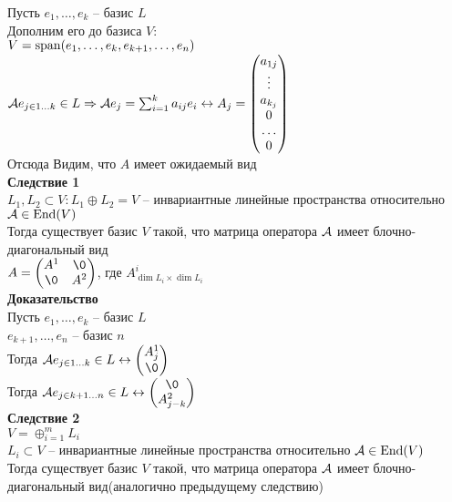 \documentclass[12pt]{article}
\begin{document}
Пусть $e_1, \ldots, e_k$ -- базис $L$\\
Дополним его до базиса $V$:\\
$V = \operatorname{span} (e_1, \ldots, e_k, e_{k+1}, \ldots, e_n)$\\
$\mathcal{A} e_{j\in 1\ldots k} \in L \Rightarrow \mathcal{A} e_j = \sum_{i=1}^k a_{ij}e_i \leftrightarrow A_j = \begin{pmatrix}
    a_{1j}\\
    \vdots\\
    a_{k_j}\\
    0\\
    \ldots\\
    0
\end{pmatrix}$\\
Отсюда Видим, что $A$ имеет ожидаемый вид\\
\textbf{Следствие 1}\\
$L_1, L_2 \subset V: L_1\oplus L_2 = V$ -- инвариантные линейные пространства относительно $\mathcal{A} \in \operatorname{End}(V)$\\
Тогда существует базис $V$ такой, что матрица оператора $\mathcal{A}$ имеет блочно-диагональный вид\\
$A = \begin{pmatrix}
    A^1 & \0\\
    \0 & A^2
\end{pmatrix}$, где $A^i_{\dim L_i\times \dim L_i}$\\
\textbf{Доказательство}\\
Пусть $e_1, \ldots, e_k$ -- базис $L$\\
$e_{k+1}, \ldots, e_n$ -- базис $n$\\
Тогда $\mcA e_{j \in 1\ldots k} \in L \lrto \begin{pmatrix}
    A^1_j\\\0
\end{pmatrix}$\\
Тогда $\mcA e_{j \in k+1\ldots n} \in L \lrto \begin{pmatrix}
    \0\\A^2_{j-k}
\end{pmatrix}$\\
\textbf{Следствие 2}\\
$V = \oplus_{i=1}^m L_i$\\
$L_i \subset V$ -- инвариантные линейные пространства относительно $\mathcal{A} \in \operatorname{End}(V)$\\
Тогда существует базис $V$ такой, что матрица оператора $\mathcal{A}$ имеет блочно-диагональный вид(аналогично предыдущему следствию)\\
\end{document}
